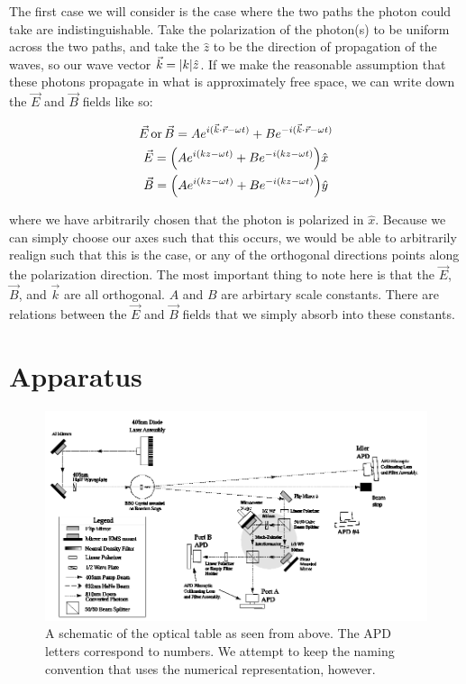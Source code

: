 \documentclass{article}
\DeclarePairedDelimiter\abs{\lvert}{\rvert}%
\DeclarePairedDelimiter{\parens}{\lparen}{\rparen}
\begin{document}
	\hspace{.5cm}

	The first case we will consider is the case where the two paths the photon could take are indistinguishable.  Take the polarization of the photon(s) to be uniform across the two paths, and take the $\hat{z}$ to be the direction of propagation of the waves, so our wave vector $\vec{k} = \abs{k}\hat{z}$.  If we make the reasonable assumption that these photons propagate in what is approximately free space, we can write down the $\vec{E}$ and $\vec{B}$ fields like so:

	\begin{gather*}
		\vec{E} \, \text{or} \, \vec{B} = Ae^{i(\vec{k} \cdot \vec{r} - \omega t)} + Be^{-i(\vec{k} \cdot \vec{r} - \omega t)}\\
		\vec{E} = \parens*{Ae^{i(kz-\omega t)} + Be^{-i(kz-\omega t)}}\hat{x}\\
		\vec{B} = \parens*{Ae^{i(kz-\omega t)} + Be^{-i(kz-\omega t)}}\hat{y}
	\end{gather*}

	where we have arbitrarily chosen that the photon is polarized in $\hat{x}$.  Because we can simply choose our axes such that this occurs, we would be able to arbitrarily realign such that this is the case, or any of the orthogonal directions points along the polarization direction.  The most important thing to note here is that the $\vec{E}$, $\vec{B}$, and $\vec{k}$ are all orthogonal.  $A$ and $B$ are arbirtary scale constants.  There are relations between the $\vec{E}$ and $\vec{B}$ fields that we simply absorb into these constants.




\section{Apparatus}

\begin{figure}[!htb]
	\centering
	\includegraphics[scale=.5]{apparatus_setup.png}
	\caption{A schematic of the optical table as seen from above.  The APD letters correspond to numbers.  We attempt to keep the naming convention that uses the numerical representation, however.}
\end{figure}
\end{document}
